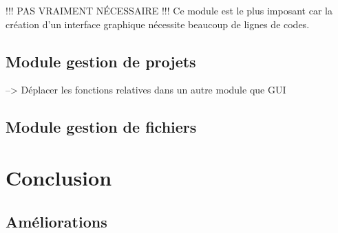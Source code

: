 \documentclass[a4paper,12pt]{article}
\begin{document}
\begin{itemize}
		\end{itemize}
		
		!!! PAS VRAIMENT NÉCESSAIRE !!! Ce module est le plus imposant car la création d'un interface graphique nécessite beaucoup de lignes de codes.
		
		\subsection{Module gestion de projets}
			--> Déplacer les fonctions relatives dans un autre module que GUI
			
		\subsection{Module gestion de fichiers}	
	
\section{Conclusion}
	
	\subsection{Améliorations}
\end{document}
